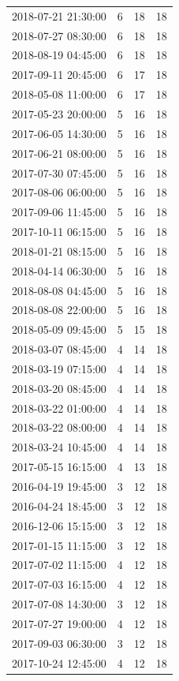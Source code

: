 \begin{tabular}{lrrr}
2018-07-21 21:30:00 & 6 & 18 & 18 \\
2018-07-27 08:30:00 & 6 & 18 & 18 \\
2018-08-19 04:45:00 & 6 & 18 & 18 \\
2017-09-11 20:45:00 & 6 & 17 & 18 \\
2018-05-08 11:00:00 & 6 & 17 & 18 \\
2017-05-23 20:00:00 & 5 & 16 & 18 \\
2017-06-05 14:30:00 & 5 & 16 & 18 \\
2017-06-21 08:00:00 & 5 & 16 & 18 \\
2017-07-30 07:45:00 & 5 & 16 & 18 \\
2017-08-06 06:00:00 & 5 & 16 & 18 \\
2017-09-06 11:45:00 & 5 & 16 & 18 \\
2017-10-11 06:15:00 & 5 & 16 & 18 \\
2018-01-21 08:15:00 & 5 & 16 & 18 \\
2018-04-14 06:30:00 & 5 & 16 & 18 \\
2018-08-08 04:45:00 & 5 & 16 & 18 \\
2018-08-08 22:00:00 & 5 & 16 & 18 \\
2018-05-09 09:45:00 & 5 & 15 & 18 \\
2018-03-07 08:45:00 & 4 & 14 & 18 \\
2018-03-19 07:15:00 & 4 & 14 & 18 \\
2018-03-20 08:45:00 & 4 & 14 & 18 \\
2018-03-22 01:00:00 & 4 & 14 & 18 \\
2018-03-22 08:00:00 & 4 & 14 & 18 \\
2018-03-24 10:45:00 & 4 & 14 & 18 \\
2017-05-15 16:15:00 & 4 & 13 & 18 \\
2016-04-19 19:45:00 & 3 & 12 & 18 \\
2016-04-24 18:45:00 & 3 & 12 & 18 \\
2016-12-06 15:15:00 & 3 & 12 & 18 \\
2017-01-15 11:15:00 & 3 & 12 & 18 \\
2017-07-02 11:15:00 & 4 & 12 & 18 \\
2017-07-03 16:15:00 & 4 & 12 & 18 \\
2017-07-08 14:30:00 & 3 & 12 & 18 \\
2017-07-27 19:00:00 & 4 & 12 & 18 \\
2017-09-03 06:30:00 & 3 & 12 & 18 \\
2017-10-24 12:45:00 & 4 & 12 & 18 \\

\end{tabular}
